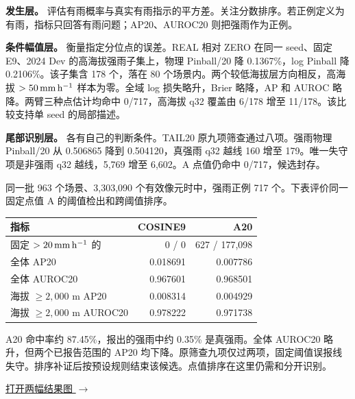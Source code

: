 \label{p-diagnosis}

\textbf{发生层。}  评估有雨概率与真实有雨指示的平方差。关注分数排序。若正例定义为有雨，指标只回答有雨问题；AP20、AUROC20 则把强雨作为正例。

\textbf{条件幅值层。}  衡量指定分位点的误差。REAL 相对 ZERO 在同一 seed、固定 E9、2024 Dev 的高海拔强雨子集上，物理 Pinball/20 降 0.1367\%，log Pinball 降 0.2106\%。该子集含 178 个，落在 80 个场景内。两个较低海拔层方向相反，高海拔 \(>50\,\mathrm{mm\,h^{-1}}\) 样本为零。全域 log 损失略升，Brier 略降，AP 和 AUROC 略降。两臂三种点估计均命中 0/717，高海拔 q32 覆盖由 6/178 增至 11/178。该比较支持单 seed 的局部描述。

\textbf{尾部识别层。} 各有自己的判断条件。TAIL20 原九项筛查通过八项。强雨物理 Pinball/20 从 0.506865 降到 0.504120，真强雨 q32 越线 160 增至 179。唯一失守项是非强雨 q32 越线，5,769 增至 6,602。A 点值仍命中 0/717，候选封存。

同一批 963 个场景、3,303,090 个有效像元时中，强雨正例 717 个。下表评价同一固定点值 A 的阈值检出和跨阈值排序。\par
\begin{tabularx}{\linewidth}{@{}Lrr@{}}
\toprule
指标 & COSINE9 & A20 \\
\midrule
固定 \(>20\,\mathrm{mm\,h^{-1}}\) 的 & 0 / 0 & 627 / 177,098 \\
全体 AP20 & 0.018691 & 0.007786 \\
全体 AUROC20 & 0.967601 & 0.968501 \\
海拔 \(\ge 2{,}000\) m AP20 & 0.008314 & 0.004929 \\
海拔 \(\ge 2{,}000\) m AUROC20 & 0.978222 & 0.971738 \\
\bottomrule
\end{tabularx}

A20 命中率约 87.45\%，报出的强雨中约 0.35\% 是真强雨。全体 AUROC20 略升，但两个已报告范围的 AP20 均下降。原筛查九项仅过两项，固定阈值误报线失守。排序补证后按预设规则结束该候选。点值排序在这里仍需和分开识别。\par\hyperlink{case-figures}{打开两幅结果图 $\rightarrow$}

